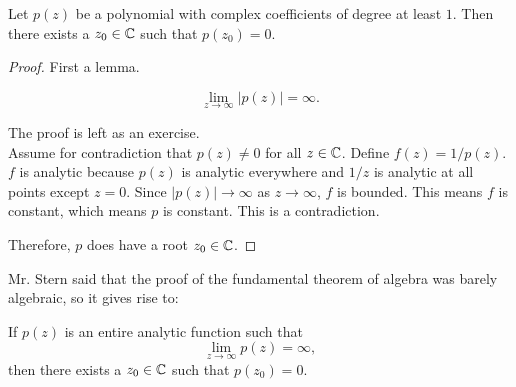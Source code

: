 \begin{theorem}
    Let $p(z)$ be a polynomial with complex coefficients of degree at least $1$.
    Then there exists a $z_0 \in \operatorname{\mathbb{C}}$ such that $p(z_0) = 0$.
\end{theorem}

\begin{proof}
    First a lemma.
    \begin{lemma}
        \[ \lim_{z \to \infty} |p(z)| = \infty. \]
    \end{lemma}
    
    The proof is left as an exercise. \\

    Assume for contradiction that $p(z) \ne 0$ for all $z \in \operatorname{\mathbb{C}}$.
    Define $f(z) = 1/p(z)$.
    $f$ is analytic because $p(z)$ is analytic everywhere 
    and $1/z$ is analytic at all points except $z = 0$.
    Since $|p(z)| \to \infty$ as $z \to \infty$, 
    $f$ is bounded.
    This means $f$ is constant, which means $p$ is constant.
    This is a contradiction.

    Therefore, $p$ does have a root $z_0 \in \operatorname{\mathbb{C}}$.

\end{proof}
    
Mr. Stern said that the proof of the fundamental theorem of algebra was barely algebraic, so it gives rise to:

\begin{theorem}
    If $p(z)$ is an entire analytic function such that
    \[ \lim_{z \to \infty} p(z) = \infty, \]
    then there exists a $z_0 \in \operatorname{\mathbb{C}}$ such that $p(z_0) = 0$.
\end{theorem}



